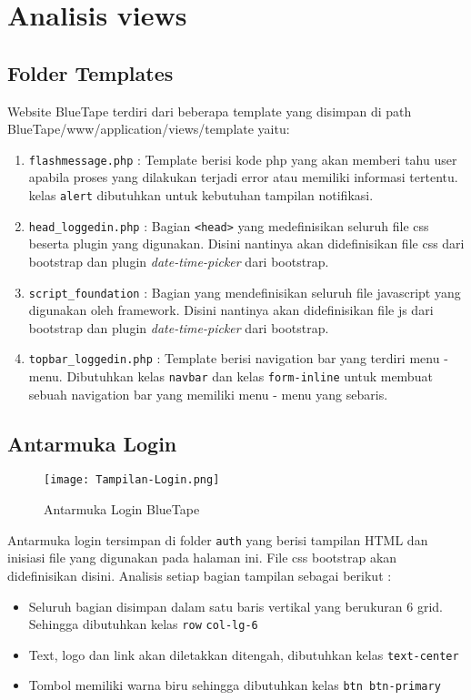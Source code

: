 \section{Analisis views}
\subsection{Folder Templates}
Website BlueTape terdiri dari beberapa template yang disimpan di path BlueTape/www/application/views/template yaitu:
\begin{enumerate}
	\item \verb|flashmessage.php| : Template berisi kode php yang akan memberi tahu user apabila proses yang dilakukan terjadi error atau memiliki informasi tertentu. kelas \verb|alert| dibutuhkan untuk kebutuhan tampilan notifikasi.	
	\item \verb|head_loggedin.php| : Bagian \texttt{<head>} yang medefinisikan seluruh file css beserta plugin yang digunakan. Disini nantinya akan didefinisikan file css dari bootstrap dan plugin \textit{date-time-picker} dari bootstrap.
	\item \verb|script_foundation| : Bagian yang mendefinisikan seluruh file javascript yang digunakan oleh framework.  Disini nantinya akan didefinisikan file js dari bootstrap dan plugin \textit{date-time-picker} dari bootstrap.
	\item \verb|topbar_loggedin.php| : Template berisi navigation bar yang terdiri menu - menu. Dibutuhkan kelas \verb|navbar| dan kelas \verb|form-inline| untuk membuat sebuah navigation bar yang memiliki menu - menu yang sebaris.
\end{enumerate}

\subsection{Antarmuka Login}
\begin{figure} [H]	
	\centering  
	\texttt{[image: Tampilan-Login.png]}  
	\caption{Antarmuka Login BlueTape} 
\end{figure}
\noindent Antarmuka login tersimpan di folder \verb|auth| yang berisi tampilan HTML dan inisiasi file yang digunakan pada halaman ini. File css bootstrap akan didefinisikan disini. Analisis setiap bagian tampilan sebagai berikut :
\begin{itemize}
	\item Seluruh bagian disimpan dalam satu baris vertikal yang berukuran 6 grid. Sehingga dibutuhkan kelas \verb|row| \verb|col-lg-6| 	
	\item Text, logo dan link akan diletakkan ditengah, dibutuhkan kelas \verb|text-center|
	\item Tombol memiliki warna biru sehingga dibutuhkan kelas \verb|btn btn-primary|
\end{itemize}


